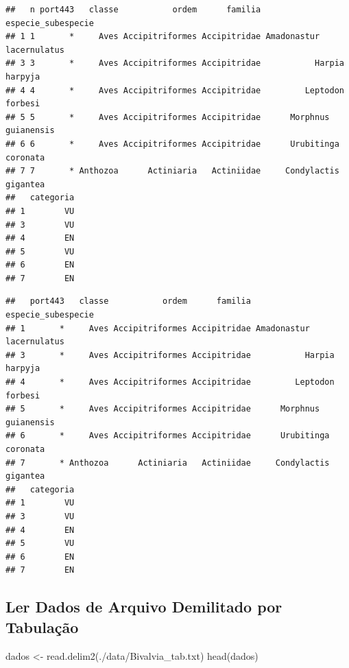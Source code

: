 \documentclass[
]{article}
\newenvironment{Shaded}{\begin{snugshade}}{\end{snugshade}}
\newcommand{\CommentTok}[1]{\textcolor[rgb]{0.56,0.35,0.01}{\textit{#1}}}
\newcommand{\ConstantTok}[1]{\textcolor[rgb]{0.00,0.00,0.00}{#1}}
\newcommand{\FunctionTok}[1]{\textcolor[rgb]{0.00,0.00,0.00}{#1}}
\newcommand{\NormalTok}[1]{#1}
\newcommand{\OtherTok}[1]{\textcolor[rgb]{0.56,0.35,0.01}{#1}}
\newcommand{\SpecialCharTok}[1]{\textcolor[rgb]{0.00,0.00,0.00}{#1}}
\newcommand{\StringTok}[1]{\textcolor[rgb]{0.31,0.60,0.02}{#1}}
\begin{document}
\begin{verbatim}
##   n port443   classe           ordem      familia       especie_subespecie
## 1 1       *     Aves Accipitriformes Accipitridae Amadonastur lacernulatus
## 3 3       *     Aves Accipitriformes Accipitridae           Harpia harpyja
## 4 4       *     Aves Accipitriformes Accipitridae         Leptodon forbesi
## 5 5       *     Aves Accipitriformes Accipitridae      Morphnus guianensis
## 6 6       *     Aves Accipitriformes Accipitridae      Urubitinga coronata
## 7 7       * Anthozoa      Actiniaria   Actiniidae     Condylactis gigantea
##   categoria
## 1        VU
## 3        VU
## 4        EN
## 5        VU
## 6        EN
## 7        EN
\end{verbatim}

\begin{Shaded}
\end{Shaded}

\begin{verbatim}
##   port443   classe           ordem      familia       especie_subespecie
## 1       *     Aves Accipitriformes Accipitridae Amadonastur lacernulatus
## 3       *     Aves Accipitriformes Accipitridae           Harpia harpyja
## 4       *     Aves Accipitriformes Accipitridae         Leptodon forbesi
## 5       *     Aves Accipitriformes Accipitridae      Morphnus guianensis
## 6       *     Aves Accipitriformes Accipitridae      Urubitinga coronata
## 7       * Anthozoa      Actiniaria   Actiniidae     Condylactis gigantea
##   categoria
## 1        VU
## 3        VU
## 4        EN
## 5        VU
## 6        EN
## 7        EN
\end{verbatim}

\hypertarget{ler-dados-de-arquivo-demilitado-por-tabulauxe7uxe3o}{%
\subsection{Ler Dados de Arquivo Demilitado por
Tabulação}\label{ler-dados-de-arquivo-demilitado-por-tabulauxe7uxe3o}}

\begin{Shaded}
\begin{Highlighting}[]
\NormalTok{dados }\OtherTok{\textless{}{-}} \FunctionTok{read.delim2}\NormalTok{(}\StringTok{\textquotesingle{}./data/Bivalvia\_tab.txt\textquotesingle{}}\NormalTok{)}
\FunctionTok{head}\NormalTok{(dados)}
\end{Highlighting}
\end{Shaded}
\end{document}
